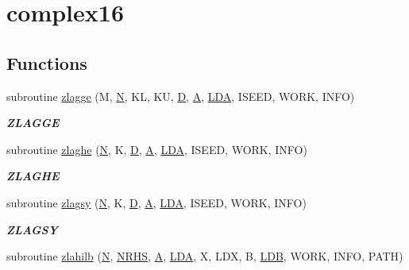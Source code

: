 \hypertarget{group__complex16__matgen}{}\section{complex16}
\label{group__complex16__matgen}
\subsection*{Functions}
\begin{DoxyCompactItemize}
\item 
subroutine \hyperlink{group__complex16__matgen_gaeb5ac1c437527a2ed37e9378d6ed3182}{zlagge} (M, \hyperlink{polmisc_8c_a0240ac851181b84ac374872dc5434ee4}{N}, K\+L, K\+U, \hyperlink{odrpack_8h_a7dae6ea403d00f3687f24a874e67d139}{D}, \hyperlink{classA}{A}, \hyperlink{example__user_8c_ae946da542ce0db94dced19b2ecefd1aa}{L\+D\+A}, I\+S\+E\+E\+D, W\+O\+R\+K, I\+N\+F\+O)
\begin{DoxyCompactList}\small\item\em {\bfseries Z\+L\+A\+G\+G\+E} \end{DoxyCompactList}\item 
subroutine \hyperlink{group__complex16__matgen_gab24f7dad3b89a12307ae6d8a74f8c7e9}{zlaghe} (\hyperlink{polmisc_8c_a0240ac851181b84ac374872dc5434ee4}{N}, K, \hyperlink{odrpack_8h_a7dae6ea403d00f3687f24a874e67d139}{D}, \hyperlink{classA}{A}, \hyperlink{example__user_8c_ae946da542ce0db94dced19b2ecefd1aa}{L\+D\+A}, I\+S\+E\+E\+D, W\+O\+R\+K, I\+N\+F\+O)
\begin{DoxyCompactList}\small\item\em {\bfseries Z\+L\+A\+G\+H\+E} \end{DoxyCompactList}\item 
subroutine \hyperlink{group__complex16__matgen_gab0fb5a84dacd12b7a664841508df25d9}{zlagsy} (\hyperlink{polmisc_8c_a0240ac851181b84ac374872dc5434ee4}{N}, K, \hyperlink{odrpack_8h_a7dae6ea403d00f3687f24a874e67d139}{D}, \hyperlink{classA}{A}, \hyperlink{example__user_8c_ae946da542ce0db94dced19b2ecefd1aa}{L\+D\+A}, I\+S\+E\+E\+D, W\+O\+R\+K, I\+N\+F\+O)
\begin{DoxyCompactList}\small\item\em {\bfseries Z\+L\+A\+G\+S\+Y} \end{DoxyCompactList}\item 
subroutine \hyperlink{group__complex16__matgen_gadea79d993de3d5b50ad2beb5b67811f4}{zlahilb} (\hyperlink{polmisc_8c_a0240ac851181b84ac374872dc5434ee4}{N}, \hyperlink{example__user_8c_aa0138da002ce2a90360df2f521eb3198}{N\+R\+H\+S}, \hyperlink{classA}{A}, \hyperlink{example__user_8c_ae946da542ce0db94dced19b2ecefd1aa}{L\+D\+A}, X, L\+D\+X, B, \hyperlink{example__user_8c_a50e90a7104df172b5a89a06c47fcca04}{L\+D\+B}, W\+O\+R\+K, I\+N\+F\+O, P\+A\+T\+H)

\end{DoxyCompactItemize}
